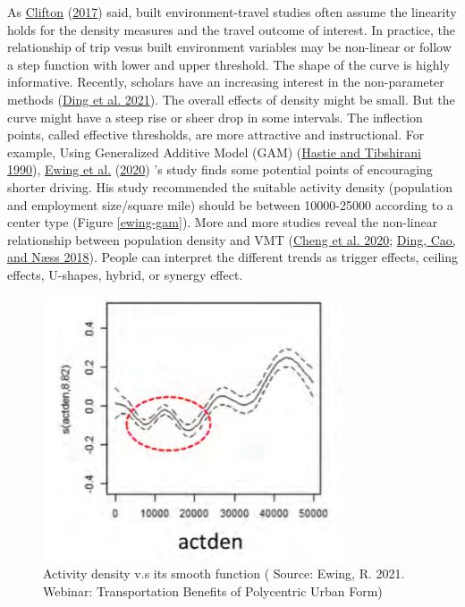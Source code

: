 \documentclass[
  11pt,
  openany]{memoir}
\begin{document}
As \protect\hyperlink{ref-cliftonGettingHereThere2017}{Clifton} (\protect\hyperlink{ref-cliftonGettingHereThere2017}{2017}) said, built environment-travel studies often assume the linearity holds for the density measures and the travel outcome of interest. In practice, the relationship of trip vesus built environment variables may be non-linear or follow a step function with lower and upper threshold. The shape of the curve is highly informative. Recently, scholars have an increasing interest in the non-parameter methods (\protect\hyperlink{ref-dingNonlinearAssociationsZonal2021}{Ding et al. 2021}). The overall effects of density might be small. But the curve might have a steep rise or sheer drop in some intervals. The inflection points, called effective thresholds, are more attractive and instructional. For example, Using Generalized Additive Model (GAM) (\protect\hyperlink{ref-hastieGeneralizedAdditiveModels1990}{Hastie and Tibshirani 1990}), \protect\hyperlink{ref-ewingReducingVehicleMiles2020}{Ewing et al.} (\protect\hyperlink{ref-ewingReducingVehicleMiles2020}{2020}) 's study finds some potential points of encouraging shorter driving. His study recommended the suitable activity density (population and employment size/square mile) should be between 10000-25000 according to a center type (Figure \ref{ewing-gam}).
More and more studies reveal the non-linear relationship between population density and VMT (\protect\hyperlink{ref-chengExaminingNonlinearBuilt2020}{Cheng et al. 2020}; \protect\hyperlink{ref-dingApplyingGradientBoosting2018}{Ding, Cao, and Næss 2018}).
People can interpret the different trends as trigger effects, ceiling effects, U-shapes, hybrid, or synergy effect.

\begin{figure}

{\centering \includegraphics[width=0.5\linewidth]{fig/Ewing_gam1} 

}

\caption{Activity density v.s its smooth function ( Source: Ewing, R. 2021. Webinar: Transportation Benefits of Polycentric Urban Form)}\label{fig:ewing-gam}
\end{figure}
\end{document}
